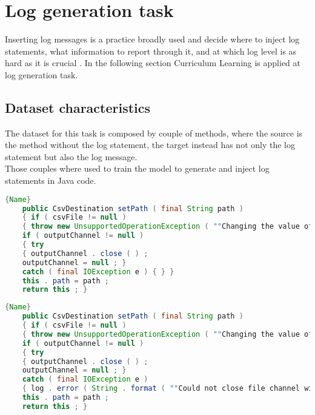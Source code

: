 \section{Log generation task}
Inserting log messages is a practice broadly used and decide where to inject log statements, what information to report through it, 
and at which log level is as hard as it is crucial \cite{Mastropaolo2022}. In the following section Curriculum Learning is applied
at log generation task.

\subsection{Dataset characteristics}
The dataset for this task is composed by couple of methods, where the source is the method without the log statement,
the target instead has not only the log statement but also the log message.\\
Those couples where used to train the model to generate and inject log statements in Java code.


\noindent\begin{minipage}{.45\textwidth}
\begin{lstlisting}[language=Java, caption={Method},label={lst:buggy1}, mathescape=true, breaklines=true]{Name}
    public CsvDestination setPath ( final String path ) 
    { if ( csvFile != null ) 
    { throw new UnsupportedOperationException ( ""Changing the value of path after opening the destination is not allowed."" ) ; } 
    if ( outputChannel != null ) 
    { try 
    { outputChannel . close ( ) ; 
    outputChannel = null ; } 
    catch ( final IOException e ) { } } 
    this . path = path ; 
    return this ; }
\end{lstlisting}
\end{minipage}\hfill
\begin{minipage}{.45\textwidth}
\begin{lstlisting}[language=Java, caption={Method + log statement},label={lst:fixed1}, mathescape=true, breaklines=true]{Name}
    public CsvDestination setPath ( final String path ) 
    { if ( csvFile != null ) 
    { throw new UnsupportedOperationException ( ""Changing the value of path after opening the destination is not allowed."" ) ; } 
    if ( outputChannel != null ) 
    { try 
    { outputChannel . close ( ) ; 
    outputChannel = null ; } 
    catch ( final IOException e ) 
    { log . error ( String . format ( ""Could not close file channel with CSV results for file %s."" , csvFile ) , e ) ; } } 
    this . path = path ; 
    return this ; }
\end{lstlisting}
\end{minipage}

